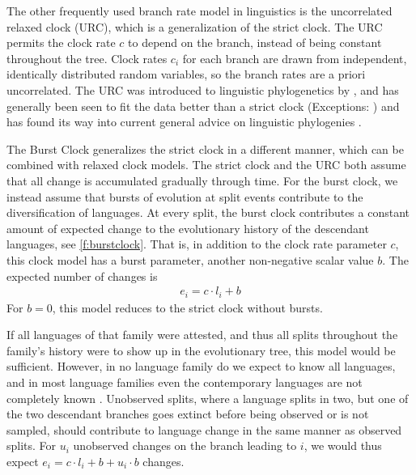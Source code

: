 \documentclass[]{rsos}%
\begin{document}
The other frequently used branch rate model in linguistics is the uncorrelated relaxed
clock (URC), which is a generalization of the strict clock.
The URC \parencite{drummond2006relaxed} permits the clock rate $c$ to depend on
the branch, instead of being constant throughout the tree. Clock
rates $c_i$ for each branch are drawn from independent, identically distributed random
variables, so the branch rates are a priori uncorrelated.
The URC was introduced to linguistic
phylogenetics by \textcite{kitchen2009bayesian}, and has generally been seen to
fit the data better than a strict clock
\parencite{bouckaert2012mapping,honkola2013cultural,lee2013evolution}
(Exceptions: \cite{savelyev2020bayesian,kaiping2021systematic})
and has found its way into current general advice on linguistic phylogenies
\parencite{maurits2017beastling,hoffmann2021bayesian}.

The Burst Clock generalizes the strict clock in a different manner, which can be combined with relaxed clock models.
The strict clock and the URC both assume that all change is accumulated gradually
through time.
For the burst clock, we instead assume that bursts of evolution at split events
contribute to the diversification of languages.
At every split, the burst clock contributes a
constant amount of expected change to the evolutionary history of the
descendant languages, see \cref{f:burstclock}. That is, in addition to the clock rate parameter $c$, this clock model
has a burst parameter, another non-negative scalar value $b$.
The expected number of changes is
\begin{align}
  e_i = c \cdot l_i + b
  \label{eq:simple-burst}
\end{align}
For $b=0$, this model reduces to the strict clock without bursts.

%

If all languages of that family were attested, and thus all splits throughout
the family's history were to show up in the evolutionary tree, this model would be sufficient.
However, in no language family do we expect to know all languages, and in most
language families even the contemporary languages are not completely known \parencite{}. 
Unobserved splits, where a language splits in two, but one of
the two descendant branches goes extinct before being observed or is not sampled,
should contribute to language change in the same manner as observed splits.
For $u_i$ unobserved changes on the branch leading to $i$, we would thus expect $e_i = c \cdot l_i + b + u_i \cdot b$ changes.
\end{document}
